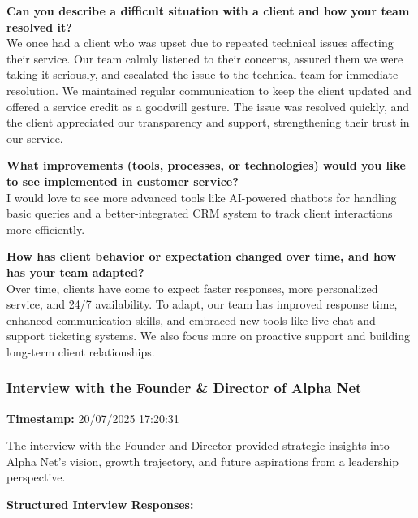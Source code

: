 \textbf{Can you describe a difficult situation with a client and how your team resolved it?}\\
We once had a client who was upset due to repeated technical issues affecting their service. Our team calmly listened to their concerns, assured them we were taking it seriously, and escalated the issue to the technical team for immediate resolution. We maintained regular communication to keep the client updated and offered a service credit as a goodwill gesture. The issue was resolved quickly, and the client appreciated our transparency and support, strengthening their trust in our service.

\textbf{What improvements (tools, processes, or technologies) would you like to see implemented in customer service?}\\
I would love to see more advanced tools like AI-powered chatbots for handling basic queries and a better-integrated CRM system to track client interactions more efficiently.

\textbf{How has client behavior or expectation changed over time, and how has your team adapted?}\\
Over time, clients have come to expect faster responses, more personalized service, and 24/7 availability. To adapt, our team has improved response time, enhanced communication skills, and embraced new tools like live chat and support ticketing systems. We also focus more on proactive support and building long-term client relationships.

\subsubsection*{Interview with the Founder \& Director of Alpha Net}
\textbf{Timestamp:} 20/07/2025 17:20:31

The interview with the Founder and Director provided strategic insights into Alpha Net's vision, growth trajectory, and future aspirations from a leadership perspective.

\textbf{Structured Interview Responses:}

